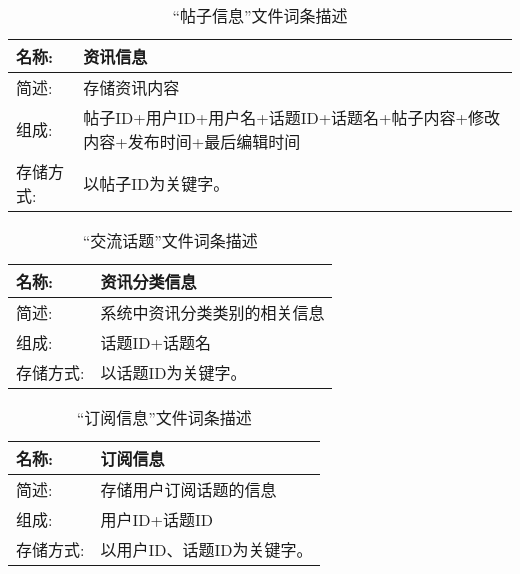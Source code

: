 \begin{table}[H]  
\caption{“帖子信息”文件词条描述}  
\begin{center}  
    \begin{tabular}{l p{10cm}} 
        \hline
        \quad 名称:  & 资讯信息 \\
        \hline
        \quad 简述:  & 存储资讯内容\\
        \hline
        \quad 组成:  & 帖子ID+用户ID+用户名+话题ID+话题名+帖子内容+修改内容+发布时间+最后编辑时间 \\
        \hline
        \quad 存储方式:  & 以帖子ID为关键字。 \\
        \hline
    \end{tabular}
    \label{tab1}
\end{center}
\end{table}

\begin{table}[H]  
\caption{“交流话题”文件词条描述}  
\begin{center}  
    \begin{tabular}{l p{10cm}} 
        \hline
        \quad 名称:  &  资讯分类信息 \\
        \hline
        \quad 简述:  & 系统中资讯分类类别的相关信息 \\
        \hline
        \quad 组成:  & 话题ID+话题名 \\
        \hline
        \quad 存储方式:  & 以话题ID为关键字。 \\
        \hline
    \end{tabular}
    \label{tab1}
\end{center}
\end{table}

\begin{table}[H]  
\caption{“订阅信息”文件词条描述}  
\begin{center}  
    \begin{tabular}{l p{10cm}} 
        \hline
        \quad 名称:  &   订阅信息 \\
        \hline
        \quad 简述:  & 存储用户订阅话题的信息 \\
        \hline
        \quad 组成:  & 用户ID+话题ID \\
        \hline
        \quad 存储方式:  & 以用户ID、话题ID为关键字。 \\
        \hline
    \end{tabular}
    \label{tab1}
\end{center}
\end{table}


